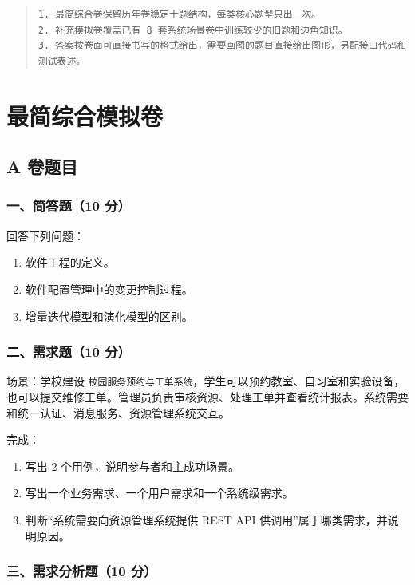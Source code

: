 \documentclass[UTF8,zihao=-4]{ctexart}
\begin{document}
\begin{quote}
\footnotesize
\begin{verbatim}
1. 最简综合卷保留历年卷稳定十题结构，每类核心题型只出一次。
2. 补充模拟卷覆盖已有 8 套系统场景卷中训练较少的旧题和边角知识。
3. 答案按卷面可直接书写的格式给出，需要画图的题目直接给出图形，另配接口代码和测试表述。
\end{verbatim}
\end{quote}


\section{最简综合模拟卷}


\subsection{A 卷题目}


\subsubsection*{一、简答题（10 分）}


回答下列问题：


\begin{enumerate}
\item 软件工程的定义。
\item 软件配置管理中的变更控制过程。
\item 增量迭代模型和演化模型的区别。
\end{enumerate}


\subsubsection*{二、需求题（10 分）}


场景：学校建设 \texttt{校园服务预约与工单系统}，学生可以预约教室、自习室和实验设备，也可以提交维修工单。管理员负责审核资源、处理工单并查看统计报表。系统需要和统一认证、消息服务、资源管理系统交互。


完成：


\begin{enumerate}
\item 写出 2 个用例，说明参与者和主成功场景。
\item 写出一个业务需求、一个用户需求和一个系统级需求。
\item 判断“系统需要向资源管理系统提供 REST API 供调用”属于哪类需求，并说明原因。
\end{enumerate}


\subsubsection*{三、需求分析题（10 分）}
\end{document}
